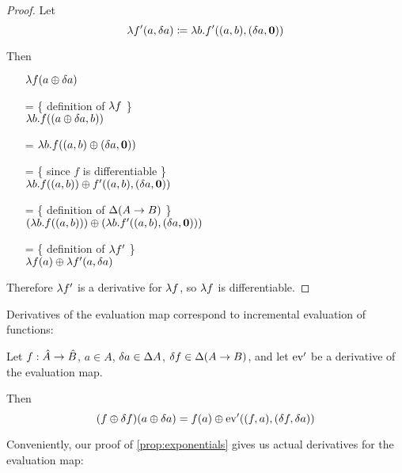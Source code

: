 \begin{proof}
  Let
  $$\lambda f'(a, \delta a) \coloneqq \lambda b. f'((a, b),
  (\delta a, \textbf{0}))$$
  
  Then
  \begin{itemize}
    \item[ ]$\lambda f(a \oplus \delta a)$
    \item[=]\{ definition of $\lambda f$ \}\\
      $\lambda b. f((a \oplus \delta a, b))$
    \item[=] $\lambda b. f((a, b) \oplus (\delta a, \textbf{0}))$
    \item[=]\{ since $f$ is differentiable \}\\
      $\lambda b. f((a, b)) \oplus f'((a, b), (\delta a, \textbf{0}))$
    \item[=]\{ definition of $\Delta (A \rightarrow B)$ \}\\
      $(\lambda b. f((a, b))) \oplus (\lambda b. f'((a, b), (\delta a, \textbf{0})))$
    \item[=]\{ definition of $\lambda f'$ \}\\
      $\lambda f(a) \oplus \lambda f'(a, \delta a)$
  \end{itemize}

  Therefore $\lambda f'$ is a derivative for $\lambda f$, so $\lambda f$
  is differentiable.
\end{proof}
\fi

Derivatives of the evaluation map correspond to incremental evaluation of functions:

\begin{prop}[Incrementalization]
\label{prop:incrementalization}
  Let $f: \hat{A} \rightarrow \hat{B}$, $a \in A$, $\delta a \in
  \Delta A$, $\delta f \in \Delta (A \rightarrow B)$, and let
  $\operatorname{ev}'$ be a derivative of the evaluation map.

  Then 
  $$(f \oplus \delta f)(a \oplus \delta a) = f(a) \oplus \operatorname{ev}'((f, a), (\delta f, \delta a))$$
\end{prop}

Conveniently, our proof of \cref{prop:exponentials} gives us actual derivatives for the evaluation map:

